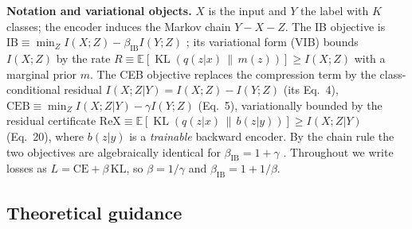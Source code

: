 

\textbf{Notation and variational objects.}
$X$ is the input and $Y$ the label with $K$ classes; the encoder induces the Markov chain
$Y - X - Z$. The IB objective is
$\mathrm{IB} \equiv \min_Z I(X;Z) - \beta_{\mathrm{IB}} I(Y;Z)$
\cite{tishby2000information}; its variational form (VIB) \cite{alemi2017deep} bounds
$I(X;Z)$ by the rate $R \equiv \mathbb{E}[\operatorname{KL}(q(z|x)\,\|\,m(z))] \ge I(X;Z)$
with a marginal prior $m$. The CEB objective \cite{fischer2020conditional} replaces the
compression term by the class-conditional residual
$I(X;Z|Y) = I(X;Z) - I(Y;Z)$ (its Eq.~4),
$\mathrm{CEB} \equiv \min_Z I(X;Z|Y) - \gamma I(Y;Z)$ (Eq.~5), variationally bounded by
the residual certificate
$\mathrm{ReX} \equiv \mathbb{E}[\operatorname{KL}(q(z|x)\,\|\,b(z|y))] \ge I(X;Z|Y)$
(Eq.~20), where $b(z|y)$ is a \emph{trainable} backward encoder. By the chain rule the
two objectives are algebraically identical for $\beta_{\mathrm{IB}} = 1 + \gamma$
\cite{geiger2020comparison}. Throughout we write losses as
$L = \mathrm{CE} + \beta\,\mathrm{KL}$, so $\beta = 1/\gamma$ and
$\beta_{\mathrm{IB}} = 1 + 1/\beta$.


\subsection{Theoretical guidance}


